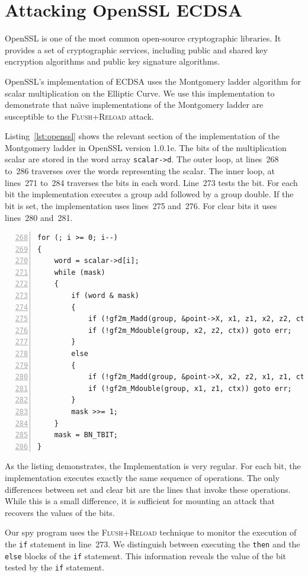 \documentclass{llncs}
\begin{document}
\section{Attacking OpenSSL ECDSA}\label{sec:attack}
OpenSSL is one of the most common open-source cryptographic libraries.
It provides a set of cryptographic services, including public and shared key encryption 
algorithms and public key signature algorithms.

OpenSSL's implementation of ECDSA uses the Montgomery ladder algorithm for scalar multiplication
on the Elliptic Curve.
We use this implementation to demonstrate that na{\"\i}ve implementations of the Montgomery ladder are
susceptible to the \textsc{Flush+Reload} attack.

Listing~\ref{lst:openssl} shows the relevant section of the implementation of the Montgomery ladder in OpenSSL version 1.0.1e.
The bits of the multiplication scalar are stored in the word array \texttt{scalar->d}.
The outer loop, at lines~268 to~286 traverses over the words representing the scalar.
The inner loop, at lines~271 to~284 traverses the bits in each word.
Line~273 tests the bit. 
For each bit the implementation executes a group add followed by a group double.
If the bit is set, the implementation uses lines~275 and~276.
For clear bits it uses lines~280 and~281.

\begin{lstlisting}[numbers=left,firstnumber=268,float=htb,caption=OpenSSL Implementation of the Montgomery Ladder,label=lst:openssl]
for (; i >= 0; i--)
{
    word = scalar->d[i];
    while (mask)
    {
        if (word & mask)
        {
            if (!gf2m_Madd(group, &point->X, x1, z1, x2, z2, ctx)) goto err;
            if (!gf2m_Mdouble(group, x2, z2, ctx)) goto err;
        }
        else
        {
            if (!gf2m_Madd(group, &point->X, x2, z2, x1, z1, ctx)) goto err;
            if (!gf2m_Mdouble(group, x1, z1, ctx)) goto err;
        }
        mask >>= 1;
    }
    mask = BN_TBIT;
}
\end{lstlisting}

As the listing demonstrates, the Implementation is very regular.
For each bit, the implementation executes exactly the same sequence of operations.
The only differences between set and clear bit are the lines that invoke these operations.
While this is a small difference, it is sufficient for mounting an attack that recovers 
the values of the bits.


Our spy program uses the \textsc{Flush+Reload} technique to monitor the execution of the \texttt{if}
statement in line~273.
We distinguish between executing the \texttt{then} and the \texttt{else} blocks of the \texttt{if}
statement.
This information reveals the value of the bit tested by the \texttt{if} statement.
\end{document}
